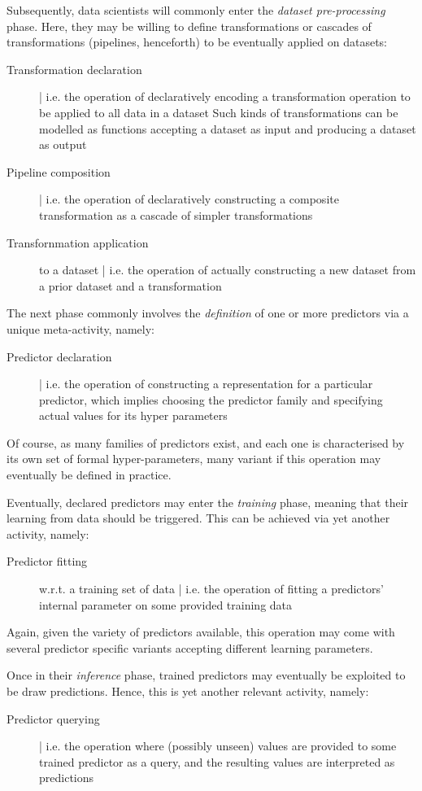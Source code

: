 \documentclass[12pt,a4paper,openright,twoside]{book}
\begin{document}
Subsequently, data scientists will commonly enter the \emph{dataset pre-processing} phase.
%
Here, they may be willing to define transformations or cascades of transformations (pipelines, henceforth) to be eventually applied on datasets:
%
\begin{description}
    \item[Transformation declaration] | i.e. the operation of declaratively encoding a transformation operation to be applied to all data in a dataset
    Such kinds of transformations can be modelled as functions accepting a dataset as input and producing a dataset as output
    \item[Pipeline composition] | i.e. the operation of declaratively constructing a composite transformation as a cascade of simpler transformations
    \item[Transfornmation application] to a dataset | i.e. the operation of actually constructing a new dataset from a prior dataset and a transformation
\end{description}

The next phase commonly involves the \emph{definition} of one or more predictors via a unique meta-activity, namely:
%
\begin{description}
    \item[Predictor declaration] | i.e. the operation of constructing a representation for a particular predictor, which implies choosing the predictor family and specifying actual values for its hyper parameters
\end{description}
%
Of course, as many families of predictors exist, and each one is characterised by its own set of formal hyper-parameters, many variant if this operation may eventually be defined in practice.

Eventually, declared predictors may enter the \emph{training} phase, meaning that their learning from data should be triggered.
%
This can be achieved via yet another activity, namely:
%
\begin{description}
    \item[Predictor fitting] w.r.t. a training set of data | i.e. the operation of fitting a predictors' internal parameter on some provided training data
\end{description}
%
Again, given the variety of predictors available, this operation may come with several predictor specific variants accepting different learning parameters.

Once in their \emph{inference} phase, trained predictors may eventually be exploited to be draw predictions.
%
Hence, this is yet another relevant activity, namely:
%
\begin{description}
    \item[Predictor querying] | i.e. the operation where (possibly unseen) values are provided to some trained predictor as a query, and the resulting values are interpreted as predictions
\end{description}
\end{document}
